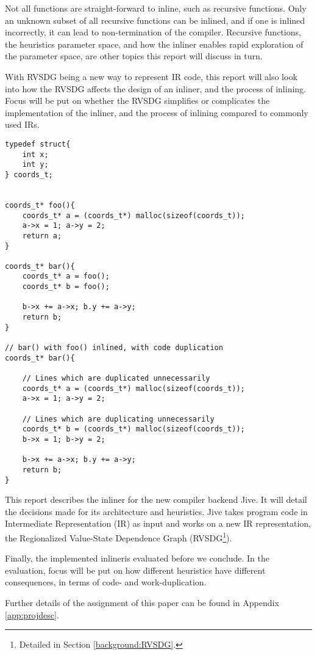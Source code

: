 Not all functions are straight-forward to inline, such as recursive functions.
Only an unknown subset of all recursive functions can be inlined, and if one is
inlined incorrectly, it can lead to non-termination of the compiler. Recursive
functions, the heuristics parameter space, and how the inliner enables rapid
exploration of the parameter space, are other topics this report will discuss in
turn.

With RVSDG being a new way to represent IR code, this report will also look into
how the RVSDG affects the design of an inliner, and the process of inlining.
Focus will be put on whether the RVSDG simplifies or complicates the
implementation of the inliner, and the process of inlining compared to commonly
used IRs.

\clearpage
\begin{lstlisting}[label={lst:code-dup}, style=customcpp,
caption={Code duplication in \textit{bar()}, when inlining \textit{foo()} into
\textit{bar()}.}]
typedef struct{
	int x;
	int y;
} coords_t;


coords_t* foo(){
	coords_t* a = (coords_t*) malloc(sizeof(coords_t));
	a->x = 1; a->y = 2;
	return a;
}

coords_t* bar(){
	coords_t* a = foo();
	coords_t* b = foo();

	b->x += a->x; b.y += a->y;
	return b;
}

// bar() with foo() inlined, with code duplication
coords_t* bar(){

	// Lines which are duplicated unnecessarily
	coords_t* a = (coords_t*) malloc(sizeof(coords_t));
	a->x = 1; a->y = 2;

	// Lines which are duplicating unnecessarily
	coords_t* b = (coords_t*) malloc(sizeof(coords_t));
	b->x = 1; b->y = 2;

	b->x += a->x; b.y += a->y;
	return b;
}
\end{lstlisting}


This report describes the inliner for the new compiler backend Jive. It will
detail the decisions made for its architecture and heuristics. Jive takes
program code in Intermediate Representation (IR) as input and works on a new IR
representation, the Regionalized Value-State Dependence Graph
(RVSDG\footnote{Detailed in Section \ref{background:RVSDG}.}).

Finally, the implemented inlineris evaluated before we conclude. In the
evaluation, focus will be put on how different heuristics have different
consequences, in terms of code- and work-duplication.

Further details of the assignment of this paper can be found in Appendix
\ref{app:projdesc}.
